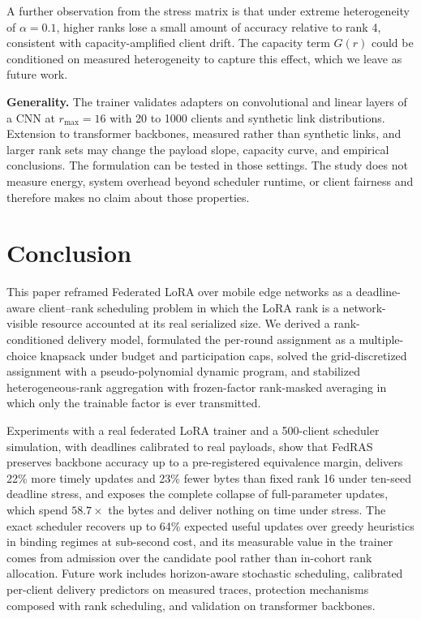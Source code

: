 \documentclass[preprint,12pt]{elsarticle}
\begin{document}
A further observation from the stress matrix is that under extreme heterogeneity of $\alpha{=}0.1$, higher ranks lose a small amount of accuracy relative to rank 4, consistent with capacity-amplified client drift. The capacity term $G(r)$ could be conditioned on measured heterogeneity to capture this effect, which we leave as future work.

\textbf{Generality.} The trainer validates adapters on convolutional and linear layers of a CNN at $r_{\max}{=}16$ with 20 to 1000 clients and synthetic link distributions. Extension to transformer backbones, measured rather than synthetic links, and larger rank sets may change the payload slope, capacity curve, and empirical conclusions. The formulation can be tested in those settings. The study does not measure energy, system overhead beyond scheduler runtime, or client fairness and therefore makes no claim about those properties.

\section{Conclusion}
\label{sec:conclusion}
This paper reframed Federated LoRA over mobile edge networks as a deadline-aware client--rank scheduling problem in which the LoRA rank is a network-visible resource accounted at its real serialized size. We derived a rank-conditioned delivery model, formulated the per-round assignment as a multiple-choice knapsack under budget and participation caps, solved the grid-discretized assignment with a pseudo-polynomial dynamic program, and stabilized heterogeneous-rank aggregation with frozen-factor rank-masked averaging in which only the trainable factor is ever transmitted.

Experiments with a real federated LoRA trainer and a 500-client scheduler simulation, with deadlines calibrated to real payloads, show that FedRAS preserves backbone accuracy up to a pre-registered equivalence margin, delivers 22\% more timely updates and 23\% fewer bytes than fixed rank 16 under ten-seed deadline stress, and exposes the complete collapse of full-parameter updates, which spend $58.7\times$ the bytes and deliver nothing on time under stress. The exact scheduler recovers up to 64\% expected useful updates over greedy heuristics in binding regimes at sub-second cost, and its measurable value in the trainer comes from admission over the candidate pool rather than in-cohort rank allocation. Future work includes horizon-aware stochastic scheduling, calibrated per-client delivery predictors on measured traces, protection mechanisms composed with rank scheduling, and validation on transformer backbones.
\end{document}
